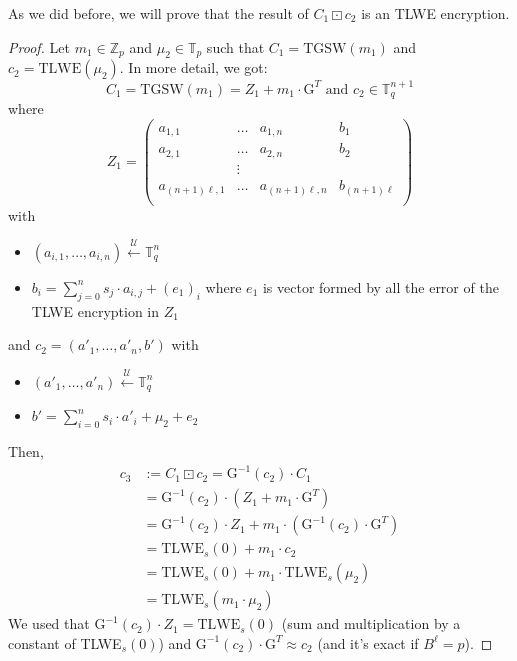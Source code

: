 \documentclass{article}
\newcommand{\Z}{\mathbb{Z}}
\newcommand{\T}{\mathbb{T}}
\newcommand{\Sunif}{\xleftarrow{\mathcal{U}}}
\theoremstyle{definition}
\theoremstyle{Theorem}
\begin{document}
As we did before, we will prove that the result of $C_1\boxdot c_2$ is an TLWE encryption.
\begin{proof}
    Let $m_1\in\Z_p$ and $\mu_2\in\T_p$ such that $C_1 = \text{TGSW}(m_1)$ and $c_2=\text{TLWE}(\mu_2)$. In more detail, we got: 
    $$C_1 = \text{TGSW}(m_1) = Z_1 + m_1\cdot\text{G}^T\text{ and } c_2\in\T_q^{n+1}$$
    where 
    $$Z_1=\begin{pmatrix}
    a_{1,1} & \ldots & a_{1,n} & b_1\\
    a_{2,1} & \ldots & a_{2,n} & b_2\\
    & \vdots & & \\
    a_{(n+1)\ell,1} & \ldots & a_{(n+1)\ell,n} & b_{(n+1)\ell}\\
    \end{pmatrix}$$
    with
    \begin{itemize}
        \item $(a_{i,1},\ldots,a_{i,n}) \Sunif \T_q^n$
        \item $b_i = \sum_{j=0}^ns_j\cdot a_{i,j} + (e_1)_i$ where $e_1$ is vector formed by all the error of the TLWE encryption in $Z_1$
    \end{itemize}
    and $c_2 = (a'_1,\ldots,a'_n,b')$ with 
    \begin{itemize}
        \item $(a'_1,\ldots,a'_n) \Sunif \T_q^n$
        \item $b' = \sum_{i=0}^ns_i\cdot a'_i + \mu_2 + e_2$
    \end{itemize}
    Then, 
    \begin{equation}
    \begin{split}
        c_3 &:= C_1 \boxdot c_2 = \text{G}^{-1}(c_2)\cdot C_1\\
        &= \text{G}^{-1}(c_2)\cdot (Z_1 + m_1\cdot\text{G}^T)\\
        &= \text{G}^{-1}(c_2)\cdot Z_1 + m_1\cdot(\text{G}^{-1}(c_2)\cdot\text{G}^T)\\
        &= \text{TLWE}_s(0) + m_1\cdot c_2\\
        &= \text{TLWE}_s(0) + m_1\cdot\text{TLWE}_s(\mu_2)\\
        &= \text{TLWE}_s(m_1\cdot\mu_2)
    \end{split}
    \end{equation}
    We used that $\text{G}^{-1}(c_2)\cdot Z_1 = \text{TLWE}_s(0)$ (sum and multiplication by a constant of TLWE$_s(0)$) and $\text{G}^{-1}(c_2)\cdot\text{G}^T\approx c_2$ (and it's exact if $B^\ell = p$).
\end{proof}
\end{document}
